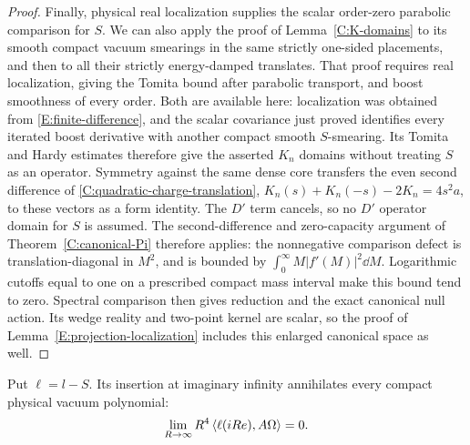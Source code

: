 \begin{proof}
Finally, physical real localization supplies the scalar order-zero
parabolic comparison for $S$.  We can also apply the proof of
Lemma~\ref{C:K-domains} to its smooth compact vacuum smearings
in the same strictly one-sided placements, and then to all their
strictly energy-damped translates.
That proof requires real localization, giving the Tomita bound after
parabolic transport, and boost smoothness of every order.  Both are
available here: localization was obtained from
\eqref{E:finite-difference}, and the scalar covariance just proved
identifies every iterated boost derivative with another compact
smooth $S$-smearing.  Its Tomita and Hardy estimates therefore give
the asserted $K_n$ domains without treating $S$ as an operator.
Symmetry against the same dense core transfers the even second
difference of \eqref{C:quadratic-charge-translation},
$K_n(s)+K_n(-s)-2K_n=4s^2a$, to these vectors as a form identity.
The $D'$ term cancels, so no $D'$ operator domain for $S$ is assumed.
The second-difference and zero-capacity argument of
Theorem~\ref{C:canonical-Pi} therefore applies: the
nonnegative comparison defect is translation-diagonal in $M^2$, and
is bounded by $\int_0^\infty M|f'(M)|^2\dd M$.  Logarithmic cutoffs
equal to one on a prescribed compact mass interval make this bound
tend to zero.  Spectral comparison then gives reduction and the exact
canonical null action.  Its wedge reality and two-point kernel are
scalar, so the proof of Lemma~\ref{E:projection-localization} includes
this enlarged canonical space as well.
\end{proof}

\begin{corollary}\label{E:infinity-vanishing}
Put $\ell=l-S$.  Its insertion at imaginary infinity annihilates every
compact physical vacuum polynomial:
\begin{equation}\label{E:residual-infinity}
 \lim_{R\to\infty}R^4\left\langle\ell(iRe),A\Omega\right\rangle=0.
\end{equation}
\end{corollary}


